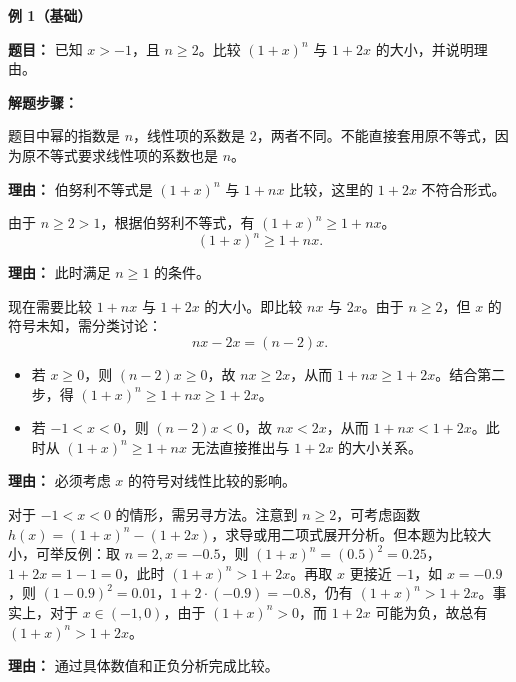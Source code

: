 \begin{examplebox}
\textbf{\textcolor{CExample}{例 1（基础）}}

\textbf{\textcolor{CExample}{题目：}} 已知 $x > -1$，且 $n \geq 2$。比较 $(1+x)^n$ 与 $1 + 2x$ 的大小，并说明理由。

\textbf{\textcolor{CExample}{解题步骤：}}
\begin{description}[style=nextline, leftmargin=2.8em, labelsep=0.5em, itemsep=0.45em]
    \item[\textbf{第一步（识别指数）：}] 题目中幂的指数是 $n$，线性项的系数是 $2$，两者不同。不能直接套用原不等式，因为原不等式要求线性项的系数也是 $n$。
    \par\textbf{理由：} 伯努利不等式是 $(1+x)^n$ 与 $1+nx$ 比较，这里的 $1+2x$ 不符合形式。

    \item[\textbf{第二步（利用已知范围）：}] 由于 $n \geq 2 > 1$，根据伯努利不等式，有 $(1+x)^n \geq 1 + nx$。
    \[
    (1+x)^n \geq 1 + nx.
    \]
    \par\textbf{理由：} 此时满足 $n \geq 1$ 的条件。

    \item[\textbf{第三步（比较线性项）：}] 现在需要比较 $1+nx$ 与 $1+2x$ 的大小。即比较 $nx$ 与 $2x$。由于 $n \geq 2$，但 $x$ 的符号未知，需分类讨论：
    \[
    nx - 2x = (n-2)x.
    \]
    \begin{itemize}[leftmargin=*, itemsep=0.2em, topsep=0.2em]
        \item 若 $x \geq 0$，则 $(n-2)x \geq 0$，故 $nx \geq 2x$，从而 $1+nx \geq 1+2x$。结合第二步，得 $(1+x)^n \geq 1+nx \geq 1+2x$。
        \item 若 $-1 < x < 0$，则 $(n-2)x < 0$，故 $nx < 2x$，从而 $1+nx < 1+2x$。此时从 $(1+x)^n \geq 1+nx$ 无法直接推出与 $1+2x$ 的大小关系。
    \end{itemize}
    \par\textbf{理由：} 必须考虑 $x$ 的符号对线性比较的影响。

    \item[\textbf{第四步（补充证明）：}] 对于 $-1 < x < 0$ 的情形，需另寻方法。注意到 $n \geq 2$，可考虑函数 $h(x)=(1+x)^n - (1+2x)$，求导或用二项式展开分析。但本题为比较大小，可举反例：取 $n=2, x=-0.5$，则 $(1+x)^n = (0.5)^2 = 0.25$，$1+2x = 1-1=0$，此时 $(1+x)^n > 1+2x$。再取 $x$ 更接近 $-1$，如 $x=-0.9$，则 $(1-0.9)^2=0.01$，$1+2\cdot(-0.9) = -0.8$，仍有 $(1+x)^n > 1+2x$。事实上，对于 $x \in (-1,0)$，由于 $(1+x)^n > 0$，而 $1+2x$ 可能为负，故总有 $(1+x)^n > 1+2x$。
    \par\textbf{理由：} 通过具体数值和正负分析完成比较。
\end{description}


\end{examplebox}
